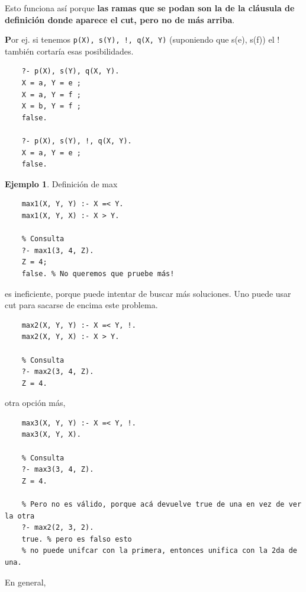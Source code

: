 \documentclass{report}
\theoremstyle{definition} %
\newtheorem*{example*}{Ejemplo}
\newenvironment{nota}[1]
    {\begin{leftbar}\textbf{#1}}
    {\end{leftbar}}
\begin{document}
Esto funciona así porque \textbf{las ramas que se podan son la de la cláusula de
definición donde aparece el cut, pero no de más arriba}.

\begin{nota}
    Por ej. si tenemos \texttt{p(X), s(Y), !, q(X, Y)} (suponiendo que s(e),
    s(f)) el ! también cortaría esas posibilidades.
    \begin{verbatim}
    ?- p(X), s(Y), q(X, Y).
    X = a, Y = e ;
    X = a, Y = f ;
    X = b, Y = f ;
    false.

    ?- p(X), s(Y), !, q(X, Y).
    X = a, Y = e ;
    false.
    \end{verbatim}
\end{nota}

\begin{example*}
    Definición de max
    \begin{verbatim}
    max1(X, Y, Y) :- X =< Y.
    max1(X, Y, X) :- X > Y.

    % Consulta
    ?- max1(3, 4, Z).
    Z = 4;
    false. % No queremos que pruebe más!
    \end{verbatim}

    es ineficiente, porque puede intentar de buscar más soluciones. Uno puede
    usar cut para sacarse de encima este problema.

    \begin{verbatim}
    max2(X, Y, Y) :- X =< Y, !.
    max2(X, Y, X) :- X > Y.

    % Consulta
    ?- max2(3, 4, Z).
    Z = 4.
    \end{verbatim}

    otra opción más,

    \begin{verbatim}
    max3(X, Y, Y) :- X =< Y, !.
    max3(X, Y, X).

    % Consulta
    ?- max3(3, 4, Z).
    Z = 4.

    % Pero no es válido, porque acá devuelve true de una en vez de ver la otra
    ?- max2(2, 3, 2).
    true. % pero es falso esto
    % no puede unifcar con la primera, entonces unifica con la 2da de una.
    \end{verbatim}
\end{example*}

En general,
\end{document}
